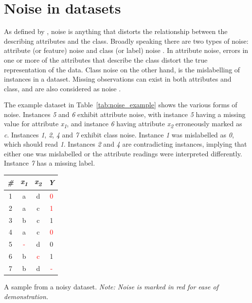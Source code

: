 \chapter{Noise in datasets}
\label{ch:noiseindatasets}

As defined by \citet{hickey1996noise}, noise is anything that distorts the relationship between the describing attributes and the class.  Broadly speaking there are two types of noise: attribute (or feature) noise and class (or label) noise \citep{garcia2013, frenay2014classification}. In attribute noise, errors in one or more of the attributes that describe the class distort the true representation of the data.  Class noise on the other hand, is the mislabelling of instances in a dataset.  Missing observations can exist in both attributes and class, and are also considered as noise \citep{zhu2004class}.

The example dataset in Table~\ref{tab:noise_example} shows the various forms of noise. Instances \textit{5} and \textit{6} exhibit attribute noise, with instance \textit{5} having a missing value for attribute \textit{x\textsubscript{1}}, and instance \textit{6} having attribute \textit{x\textsubscript{2}} erroneously marked as \textit{c}. Instances \textit{1}, \textit{2}, \textit{4} and \textit{7} exhibit class noise.  Instance \textit{1} was mislabelled as \textit{0}, which should read \textit{1}.  Instances \textit{2} and \textit{4} are contradicting instances, implying that either one was mislabelled or the attribute readings were interpreted differently. Instance \textit{7} has a missing label.

\begin{margintable}
  \centering
  \selectfont
  \begin{tabular}{cccc}
    \toprule
        \textit{\#} & \textit{x\textsubscript{1}} & \textit{x\textsubscript{2}} & \textit{Y} \\
    \midrule
    1 & a & d & \textcolor{red}{0} \\
    2 & a & c & \textcolor{red}{1} \\
    3 & b & c & 1 \\
    4 & a & c & \textcolor{red}{0} \\
    5 & \textcolor{red}{-} & d & 0 \\
    6 & b & \textcolor{red}{c} & 1 \\
    7 & b & d & \textcolor{red}{-} \\
    \bottomrule
  \end{tabular}
  \caption{A sample from a noisy dataset. \textit{Note: Noise is marked in red for ease of demonstration.}}
  \label{tab:noise_example}
\end{margintable}


